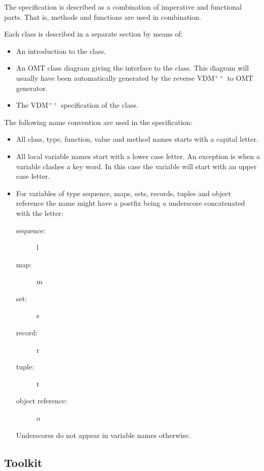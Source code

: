 \documentclass[11pt]{article}
\newcommand{\vdmpp}{{\small VDM}$^{++}$\/}
\begin{document}
The specification is described as a combination of imperative and
functional parts. That is, methods and functions are used in
combination.

Each class is described in a separate section by means of:
\begin{itemize}
\item An introduction to the class.
\item An OMT class diagram giving the interface to the class. This
  diagram will usually have been automatically generated by the
  reverse \vdmpp{} to OMT generator.
\item The \vdmpp{} specification of the class.
\end{itemize}


The following name convention are used in the specification:
\begin{itemize}
\item All class, type, function, value and method names starts with a
  capital letter.
\item All local variable names start with a lower case letter. An
  exception is when a variable clashes a key word. In this case the
  variable will start with an upper case letter.
\item For variables of type sequence, maps, sets, records, tuples and
  object reference the name might have a postfix being a underscore
  concatenated with the letter:
  \begin{description}
  \item[sequence: ] l
  \item[map: ] m
  \item[set: ] s
  \item[record: ] r
  \item[tuple: ] t
  \item[object reference: ] o
  \end{description}

  Underscores do not appear in variable names otherwise.

\end{itemize}


\subsection{Toolkit}
\label{sec:tkit}
\end{document}
